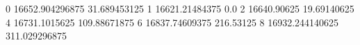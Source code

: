 0 16652.904296875 31.689453125
1 16621.21484375 0.0
2 16640.90625 19.69140625
4 16731.1015625 109.88671875
6 16837.74609375 216.53125
8 16932.244140625 311.029296875
